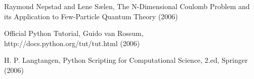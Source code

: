 
\begin{thebibliography}{3in}
 Raymond Nepstad and Lene Sælen, The N-Dimensional Coulomb Problem and its Application to Few-Particle Quantum Theory (2006)

 Official Python Tutorial, Guido van Rossum, http://docs.python.org/tut/tut.html (2006)

 H. P. Langtangen, Python Scripting for Computational Science, 2.ed, Springer (2006)
\end{thebibliography}
